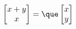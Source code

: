 \documentclass[preview]{standalone}
\begin{document}
\begin{align*}
\begin{bmatrix} x + y \\ x \end{bmatrix} = \que\begin{bmatrix} x \\ y \end{bmatrix}
\end{align*}
\end{document}
